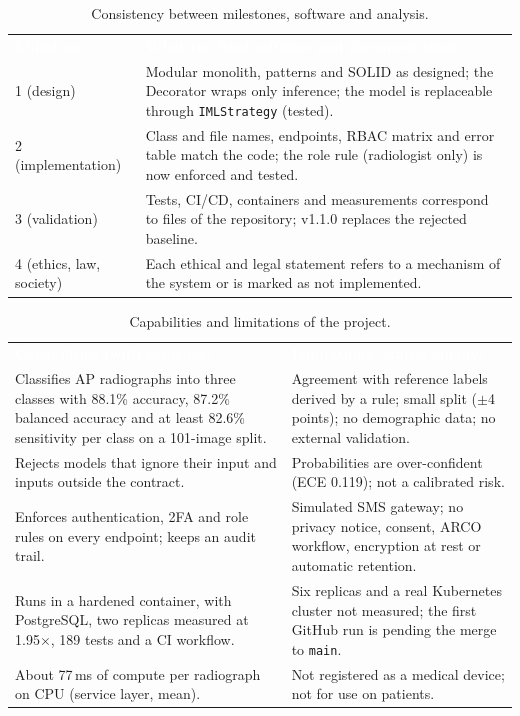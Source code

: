 \documentclass[12pt,a4paper]{article}
\newcommand{\hd}[1]{\textcolor{white}{\textbf{#1}}}
\begin{document}
\begin{table}[H]
\centering
\caption{Consistency between milestones, software and analysis.}
\label{tab:consistency}
\renewcommand{\arraystretch}{1.25}
\begin{tabularx}{\textwidth}{L{3.0cm} Y}
\hd{Milestone} & \hd{What the final software and document show} \\
1 (design) & Modular monolith, patterns and SOLID as designed; the Decorator wraps only inference; the model is replaceable through \texttt{IMLStrategy} (tested). \\
2 (implementation) & Class and file names, endpoints, RBAC matrix and error table match the code; the role rule (radiologist only) is now enforced and tested. \\
3 (validation) & Tests, CI/CD, containers and measurements correspond to files of the repository; v1.1.0 replaces the rejected baseline. \\
4 (ethics, law, society) & Each ethical and legal statement refers to a mechanism of the system or is marked as not implemented. \\
\end{tabularx}
\end{table}

\begin{table}[H]
\centering
\caption{Capabilities and limitations of the project.}
\label{tab:capabilities}
\renewcommand{\arraystretch}{1.25}
\begin{tabularx}{\textwidth}{Y Y}
\hd{Capabilities (with evidence)} & \hd{Limitations (stated openly)} \\
Classifies AP radiographs into three classes with 88.1\% accuracy, 87.2\% balanced accuracy and at least 82.6\% sensitivity per class on a 101-image split. & Agreement with reference labels derived by a rule; small split ($\pm$4 points); no demographic data; no external validation. \\
Rejects models that ignore their input and inputs outside the contract. & Probabilities are over-confident (ECE 0.119); not a calibrated risk. \\
Enforces authentication, 2FA and role rules on every endpoint; keeps an audit trail. & Simulated SMS gateway; no privacy notice, consent, ARCO workflow, encryption at rest or automatic retention. \\
Runs in a hardened container, with PostgreSQL, two replicas measured at 1.95$\times$, 189 tests and a CI workflow. & Six replicas and a real Kubernetes cluster not measured; the first GitHub run is pending the merge to \texttt{main}. \\
About 77\,ms of compute per radiograph on CPU (service layer, mean). & Not registered as a medical device; not for use on patients. \\
\end{tabularx}
\end{table}
\end{document}
